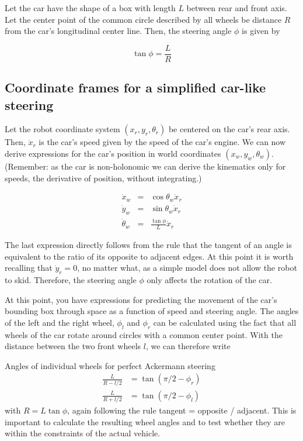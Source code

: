 Let the car have the shape of a box with length $ L$ between rear and front axis. Let the center point of the common circle described by all wheels be distance $ R$ from the car's longitudinal center line.  Then, the steering angle $ \phi$ is given by

\begin{equation}
\tan \phi = \frac{L}{R}
\end{equation}


\subsection{Coordinate frames for a simplified car-like steering}
Let the robot coordinate system $ (x_r,y_r,\theta_r)$ be centered on the car's rear axis. Then, $ \dot{x}_r$ is the car's speed given by the speed of the car's engine. We can now derive expressions for the car's position in world coordinates $ (x_w,y_w,\theta_w)$.  (Remember: as the car is non-holonomic we can derive the kinematics only for speeds, the derivative of position, without integrating.)

\begin{eqnarray}
\dot{x}_w&=&\cos{\theta_w}\dot{x}_r\\
\dot{y}_w&=&\sin{\theta_w}\dot{x}_r\\
\dot{\theta}_w&=&\frac{\tan{\phi}}{L}\dot{x}_r
\end{eqnarray}

The last expression directly follows from the rule that the tangent of an angle is equivalent to the ratio of its opposite to adjacent edges. At this point it is worth recalling that $ \dot{y}_r=0$, no matter what, as a simple model does not allow the robot to skid. Therefore, the steering angle $ \phi$ only affects the rotation of the car.

At this point, you have expressions for predicting the movement of the car's bounding box through space as a function of speed and steering angle. The angles of the left and the right wheel, $ \phi_l$ and $ \phi_r$ can be calculated using the fact that all wheels of the car rotate around circles with a common center point. With the distance between the two front wheels $ l$, we can therefore write

Angles of individual wheels for perfect Ackermann steering
\begin{eqnarray}
\frac{L}{R-l/2}&=\tan{(\pi/2-\phi_r)}\\
\frac{L}{R+l/2}&=\tan{(\pi/2-\phi_l)}
\end{eqnarray}
with $ R=L\tan{\phi}$, again following the rule tangent = opposite / adjacent. This is important to calculate the resulting wheel angles and to test whether they are within the constraints of the actual vehicle.
